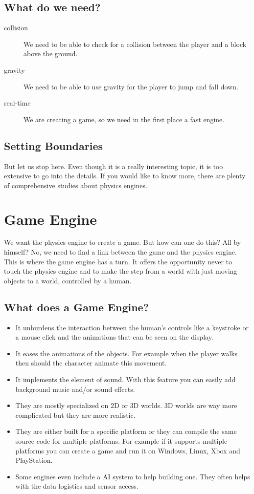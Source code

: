 \subsection{What do we need?}
\begin{description}
  \item[collision] We need to be able to check for a collision between the player and a block above the ground.
  \item[gravity] We need to be able to use gravity for the player to jump and fall down. 
  \item[real-time] We are creating a game, so we need in the first place a fast engine.
\end{description}
\subsection{Setting Boundaries}
But let us stop here. Even though it is a really interesting topic, it is too extensive to go into the details. If you would like to know more, there are plenty of comprehensive studies about physics engines.
\newpage

\section{Game Engine}
We want the physics engine to create a game. But how can one do this? All by himself? No, we need to find a link between the game and the physics engine. This is where the game engine has a turn. It offers the opportunity never to touch the physics engine and to make the step from a world with just moving objects to a world, controlled by a human.
\subsection{What does a Game Engine?}
\begin{itemize}
  \item It unburdens the interaction between the human's controls like a keystroke or a mouse click and the animations that can be seen on the display.
  \item It eases the animations of the objects. For example when the player walks then should the character animate this movement.
  \item It implements the element of sound. With this feature you can easily add background music and/or sound effects.
  \item They are mostly specialized on 2D or 3D worlds. 3D worlds are way more complicated but they are more realistic.
  \item They are either built for a specific platform or they can compile the same source code for multiple platforms. For example if it supports multiple platforms you can create a game and run it on Windows, Linux, Xbox and PlayStation.
  \item Some engines even include a AI system to help building one. They often helps with the data logistics and sensor access.
\end{itemize}

